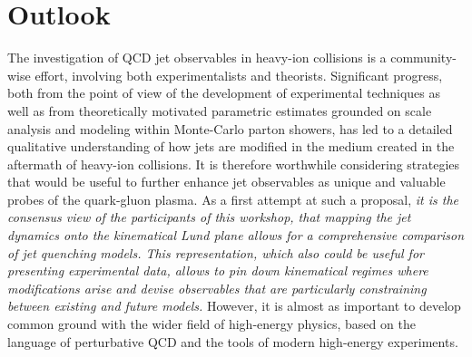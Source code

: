 
\section{Outlook}
\label{sec:outlook}

The investigation of QCD jet observables in heavy-ion collisions is a community-wise effort, involving both experimentalists and theorists. 
Significant progress, both from the point of view of the development of experimental techniques as well as from theoretically motivated parametric estimates grounded on scale analysis and modeling within Monte-Carlo parton showers, has led to a detailed qualitative understanding of how jets are modified in the medium created in the aftermath of heavy-ion collisions.
It is therefore worthwhile considering 
strategies that would be useful to further enhance jet observables as unique and valuable probes of the quark-gluon plasma.
As a first attempt at such a proposal, 
\emph{it is the consensus view of the participants of this workshop, that mapping the jet dynamics onto the kinematical Lund plane allows for a comprehensive comparison of jet quenching models.
This representation, which also could be useful for presenting experimental data, allows to pin down kinematical regimes where modifications arise and devise observables that are particularly constraining between existing and future models.}
However, it is almost as important to develop common ground with the wider field of high-energy physics, based on the language of perturbative QCD and the tools of modern high-energy experiments.


